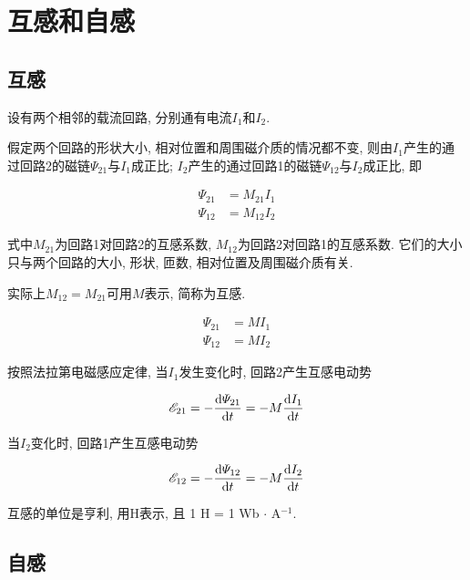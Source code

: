 \section{互感和自感}\label{9.3}

\subsection{互感}

设有两个相邻的载流回路, 分别通有电流$I_1$和$I_2$. 

假定两个回路的形状大小, 相对位置和周围磁介质的情况都不变, 则由$I_1$产生的通过回路2的磁链$\varPsi_{21}$与$I_1$成正比; $I_2$产生的通过回路1的磁链$\varPsi_{12}$与$I_2$成正比, 即

\begin{equation*}
	\begin{split}
		\varPsi_{21} &= M_{21} I_1 \\
		\varPsi_{12} &= M_{12} I_2
	\end{split}
\end{equation*}

式中$M_{21}$为回路1对回路2的互感系数, $M_{12}$为回路2对回路1的互感系数. 它们的大小只与两个回路的大小, 形状, 匝数, 相对位置及周围磁介质有关. 

实际上$M_{12} = M_{21}$可用$M$表示, 简称为互感. 

\begin{equation}
	\begin{split}
		\varPsi_{21} &= M I_1 \\
		\varPsi_{12} &= M I_2
	\end{split}
	\label{C9-eq13}
\end{equation}

按照法拉第电磁感应定律, 当$I_1$发生变化时, 回路2产生互感电动势

\begin{equation}
	\mathscr{E}_{21} = -\dv{\varPsi_{21}}{t} = -M \dv{I_1}{t} \label{C9-eq14}
\end{equation}

当$I_2$变化时, 回路1产生互感电动势

\begin{equation}
	\mathscr{E}_{12} = -\dv{\varPsi_{12}}{t} = -M \dv{I_2}{t} \label{C9-eq15}
\end{equation}

互感的单位是亨利, 用H表示, 且 1 H = 1 Wb $\cdot$ A$^{-1}$.  

\subsection{自感}

